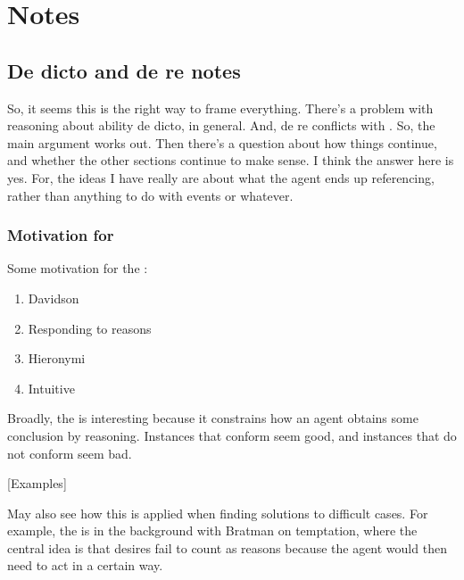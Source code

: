 \chapter{Notes}
\label{cha:notes}

\section{De dicto and de re notes}
\label{sec:de-dicto-de}

So, it seems this is the right way to frame everything.
There's a problem with reasoning about ability de dicto, in general.
And, de re conflicts with \ESU{}.
So, the main argument works out.
Then there's a question about how things continue, and whether the other sections continue to make sense.
I think the answer here is yes.
For, the ideas I have really are about what the agent ends up referencing, rather than anything to do with events or whatever.

\subsection{Motivation for \ESU{}}
\label{sec:motiv-main-prem}

Some motivation for the \ESU{}:

\begin{enumerate}
\item Davidson
\item Responding to reasons
\item Hieronymi
\item Intuitive
\end{enumerate}

Broadly, the \ESU{} is interesting because it constrains how an agent obtains some conclusion by reasoning.
Instances that conform seem good, and instances that do not conform seem bad.

[Examples]

May also see how this is applied when finding solutions to difficult cases.
For example, the \ESU{} is in the background with Bratman on temptation, where the central idea is that desires fail to count as reasons because the agent would then need to act in a certain way.

